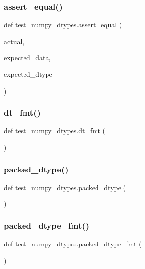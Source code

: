 \subsubsection{\texorpdfstring{assert\_equal()}{assert\_equal()}}
{\footnotesize\ttfamily def test\+\_\+numpy\+\_\+dtypes.\+assert\+\_\+equal (\begin{DoxyParamCaption}\item[{}]{actual,  }\item[{}]{expected\+\_\+data,  }\item[{}]{expected\+\_\+dtype }\end{DoxyParamCaption})}

\mbox{\label{namespacetest__numpy__dtypes_a3340c292037469bf3bac5188bd37079c}} 
\subsubsection{\texorpdfstring{dt\_fmt()}{dt\_fmt()}}
{\footnotesize\ttfamily def test\+\_\+numpy\+\_\+dtypes.\+dt\+\_\+fmt (\begin{DoxyParamCaption}{ }\end{DoxyParamCaption})}

\mbox{\label{namespacetest__numpy__dtypes_ac0c202d9ca2c124710d75697edbcae74}} 
\subsubsection{\texorpdfstring{packed\_dtype()}{packed\_dtype()}}
{\footnotesize\ttfamily def test\+\_\+numpy\+\_\+dtypes.\+packed\+\_\+dtype (\begin{DoxyParamCaption}{ }\end{DoxyParamCaption})}

\mbox{\label{namespacetest__numpy__dtypes_ac7774fc6b30b6ce64ac905a92d2e42b9}} 
\subsubsection{\texorpdfstring{packed\_dtype\_fmt()}{packed\_dtype\_fmt()}}
{\footnotesize\ttfamily def test\+\_\+numpy\+\_\+dtypes.\+packed\+\_\+dtype\+\_\+fmt (\begin{DoxyParamCaption}{ }\end{DoxyParamCaption})}

